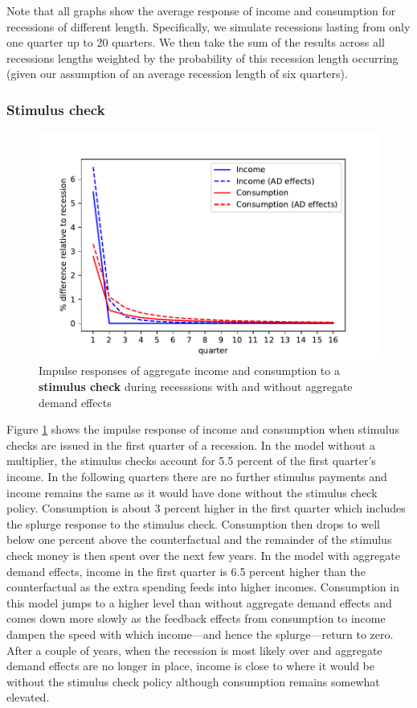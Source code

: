 \documentclass[../HAFiscal]{subfiles}
\begin{document}
Note that all graphs show the average response of income and consumption for recessions of different length. Specifically, we simulate recessions lasting from only one quarter up to 20 quarters. We then take the sum of the results across all recessions lengths weighted by the probability of this recession length occurring (given our assumption of an average recession length of six quarters).

\subsubsection{Stimulus check} 

\begin{figure}
	\centering
	\includegraphics[width=0.8\linewidth]{Code/HA-Models/FromPandemicCode/Figures/recession_Check_relrecession}
	\caption{Impulse responses of aggregate income and consumption to a \textbf{stimulus check} during recesssions with and without aggregate demand effects}
	\label{fig:recessioncheckrelrecession}
\end{figure}

Figure \ref{fig:recessioncheckrelrecession} shows the impulse response of income and consumption when stimulus checks are issued in the first quarter of a recession. In the model without a multiplier, the stimulus checks account for 5.5 percent of the first quarter's income. In the following quarters there are no further stimulus payments and income remains the same as it would have done without the stimulus check policy. Consumption is about 3 percent higher in the first quarter which includes the splurge response to the stimulus check. Consumption then drops to well below one percent above the counterfactual and the remainder of the stimulus check money is then spent over the next few years. In the model with aggregate demand effects, income in the first quarter is 6.5 percent higher than the counterfactual as the extra spending feeds into higher incomes. Consumption in this model jumps to a higher level than without aggregate demand effects and comes down more slowly as the feedback effects from consumption to income dampen the speed with which income---and hence the splurge---return to zero. After a couple of years, when the recession is most likely over and aggregate demand effects are no longer in place, income is close to where it would be without the stimulus check policy although consumption remains somewhat elevated.
\end{document}
